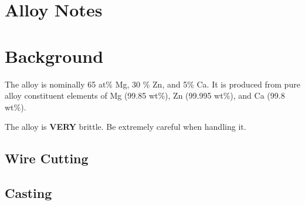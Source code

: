 \section{\MgZnCa Alloy Notes}

\section{Background}
The \MgZnCa alloy is nominally 65 at\% Mg, 30 \% Zn, and 5\% Ca. It is produced from pure alloy constituent elements of Mg (99.85 wt\%), Zn (99.995 wt\%), and Ca (99.8 wt\%). 

The \MgZnCa alloy is \textbf{VERY} brittle. Be extremely careful when handling it. 

\subsection{Wire Cutting}


\subsection{Casting}

